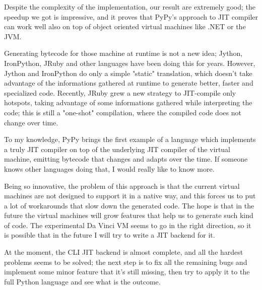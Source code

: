 {Despite the complexity of the implementation, our result are extremely good; the speedup we got is impressive, and it proves that PyPy's approach to JIT compiler can work well also on top of object oriented virtual machines like .NET or the JVM.

Generating bytecode for those machine at runtime is not a new idea; Jython, IronPython, JRuby and other languages have been doing this for years. However, Jython and IronPython do only a simple "static" translation, which doesn't take advantage of the informations gathered at runtime to generate better, faster and specialized code. Recently, JRuby grew a new strategy to JIT-compile only hotspots, taking advantage of some informations gathered while interpreting the code; this is still a "one-shot" compilation, where the compiled code does not change over time.

To my knowledge, PyPy brings the first example of a language which implements a truly JIT compiler on top of the underlying JIT compiler of the virtual machine, emitting bytecode that changes and adapts over the time. If someone knows other languages doing that, I would really like to know more.

Being so innovative, the problem of this approach is that the current virtual machines are not designed to support it in a native way, and this forces us to put a lot of workarounds that slow down the generated code. The hope is that in the future the virtual machines will grow features that help us to generate such kind of code. The experimental Da Vinci VM seems to go in the right direction, so it is possible that in the future I will try to write a JIT backend for it.

At the moment, the CLI JIT backend is almost complete, and all the hardest problems seems to be solved; the next step is to fix all the remaining bugs and implement some minor feature that it's still missing, then try to apply it to the full Python language and see what is the outcome.
}

